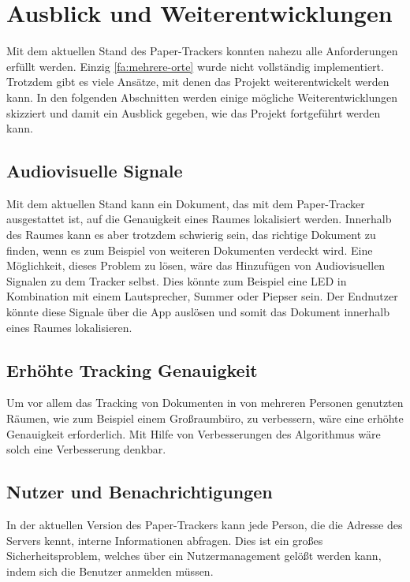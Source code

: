 \chapter{Ausblick und Weiterentwicklungen}

Mit dem aktuellen Stand des Paper-Trackers konnten nahezu alle Anforderungen erfüllt werden. Einzig \ref*{fa:mehrere-orte} wurde nicht vollständig implementiert.
Trotzdem gibt es viele Ansätze, mit denen das Projekt weiterentwickelt werden kann.
In den folgenden Abschnitten werden einige mögliche Weiterentwicklungen skizziert und damit ein Ausblick gegeben,
wie das Projekt fortgeführt werden kann.

\section{Audiovisuelle Signale}

Mit dem aktuellen Stand kann ein Dokument, das mit dem Paper-Tracker ausgestattet ist, auf die Genauigkeit eines Raumes
lokalisiert werden.
Innerhalb des Raumes kann es aber trotzdem schwierig sein, das richtige Dokument zu finden, wenn es zum Beispiel von
weiteren Dokumenten verdeckt wird.
Eine Möglichkeit, dieses Problem zu lösen, wäre das Hinzufügen von Audiovisuellen Signalen zu dem Tracker selbst.
Dies könnte zum Beispiel eine \gls{LED} in Kombination mit einem Lautsprecher, Summer oder Piepser sein.
Der Endnutzer könnte diese Signale über die App auslösen und somit das Dokument innerhalb eines Raumes lokalisieren.

\section{Erhöhte Tracking Genauigkeit}

Um vor allem das Tracking von Dokumenten in von mehreren Personen genutzten Räumen, wie zum Beispiel einem Großraumbüro,
zu verbessern, wäre eine erhöhte Genauigkeit erforderlich.
Mit Hilfe von Verbesserungen des Algorithmus wäre solch eine Verbesserung denkbar.

\section{Nutzer und Benachrichtigungen}

In der aktuellen Version des Paper-Trackers kann jede Person, die die Adresse des Servers kennt, interne Informationen
abfragen.
Dies ist ein großes Sicherheitsproblem, welches über ein Nutzermanagement gelößt werden kann, indem sich die Benutzer
anmelden müssen.

